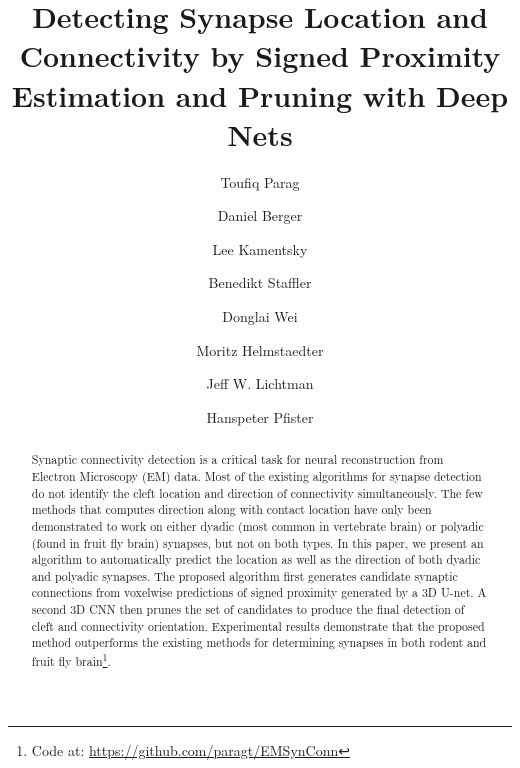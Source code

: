 \documentclass{llncs}
\begin{document}
\title{Detecting Synapse Location and Connectivity by Signed Proximity Estimation and Pruning with Deep Nets}

\author{Toufiq Parag \and Daniel Berger \and Lee Kamentsky \and Benedikt Staffler \and Donglai Wei  \and Moritz Helmstaedter \and 
Jeff W. Lichtman \and Hanspeter Pfister}



\maketitle
\thispagestyle{empty}

\setcounter{footnote}{0}


\begin{abstract}

Synaptic connectivity detection is a critical task for neural reconstruction from Electron Microscopy (EM) data. Most of the existing algorithms for synapse detection do not identify the cleft location and direction of connectivity simultaneously. The few methods that computes direction along with contact location have only been demonstrated to work on either dyadic (most common in vertebrate brain) or polyadic (found in fruit fly brain) synapses, but not on both types. In this paper, we present an algorithm to automatically predict the location as well as the direction of both dyadic and polyadic synapses. The proposed algorithm first generates candidate synaptic connections from voxelwise predictions of signed proximity generated by a 3D U-net. A second 3D CNN then prunes the set of candidates to produce the final detection of cleft and connectivity orientation. Experimental results demonstrate that the proposed method outperforms the existing methods for determining synapses in both rodent and fruit fly brain\footnote{\scriptsize Code at: \url{https://github.com/paragt/EMSynConn}}.

\end{abstract}
\end{document}
